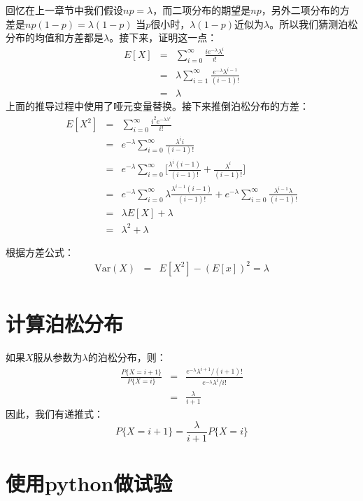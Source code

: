\documentclass[10pt,a4paper,UTF8]{article}
\begin{document}
回忆在上一章节中我们假设\(np=\lambda\)，而二项分布的期望是\(np\)，另外二项分布的方差是\(np(1-p) = \lambda (1-p)\) 当\(p\)很小时，\(\lambda (1-p)\)近似为\(\lambda\)。所以我们猜测泊松分布的均值和方差都是\(\lambda\)。接下来，证明这一点：
\begin{eqnarray}
\label{eq:6}
E[X]&=& \sum_{i=0}^{\infty} \frac{i e^{-\lambda} \lambda^{i}}{i!} \\
&=& \lambda \sum_{i=1}^{\infty} \frac{ e^{-\lambda} \lambda^{i-1} }{ (i-1)!} \\
&=& \lambda
\end{eqnarray}
上面的推导过程中使用了哑元变量替换。接下来推倒泊松分布的方差：
\begin{eqnarray}
\label{eq:7}
E[X^{2}]&=& \sum_{i=0}^{\infty} \frac{i^{2} e^{-\lambda \lambda^{i}}}{i!} \\
&=& e^{-\lambda} \sum_{i=0}^{\infty} \frac{ \lambda^{i}i }{ (i-1)!} \\
&=& e^{-\lambda} \sum_{i=0}^{\infty} \bigg[ \frac{\lambda^{i}(i-1)}{ (i-1)!}  + \frac{\lambda^{i}}{(i-1)!} \bigg] \\
&=& e^{-\lambda}\sum_{i=0}^{\infty} \lambda \frac{\lambda^{i-1}(i-1)}{(i-1)!} + e^{-\lambda}\sum_{i=0}^{\infty} \frac{\lambda^{i-1}\lambda}{(i-1)!} \\
&=& \lambda E[X] + \lambda \\
&=& \lambda^{2} + \lambda
\end{eqnarray}

根据方差公式：
\begin{eqnarray}
\label{eq:8}
\mathrm{Var}(X)&=& E[X^{2}] - (E[x])^{2} = \lambda \\
\end{eqnarray}
\section{计算泊松分布}
\label{sec:org96ce01b}


如果\(X\)服从参数为\(\lambda\)的泊松分布，则：
\begin{eqnarray}
\label{eq:9}
\frac{P\{X=i+1\} }{P\{X=i\}}&=& \frac{ e^{-\lambda} \lambda^{i+1}/ (i+1)! }{ e^{-\lambda} \lambda^{i}/ i! } \\
&=& \frac{\lambda}{i+1}
\end{eqnarray}
因此，我们有递推式：
\begin{equation}
\label{eq:10}
P\{ X = i +1 \} = \frac{\lambda}{i+1} P\{X=i\}
\end{equation}
\section{使用python做试验}
\label{sec:orgbfcdaad}
\end{document}
